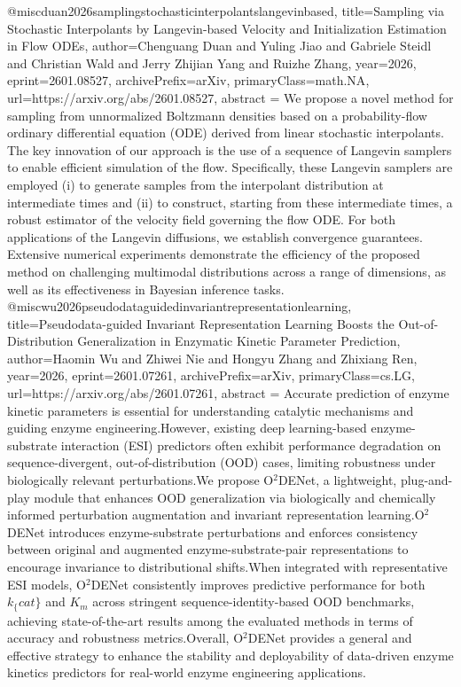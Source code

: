 {}@misc{duan2026samplingstochasticinterpolantslangevinbased,
      title={Sampling via Stochastic Interpolants by Langevin-based Velocity and Initialization Estimation in Flow ODEs}, 
      author={Chenguang Duan and Yuling Jiao and Gabriele Steidl and Christian Wald and Jerry Zhijian Yang and Ruizhe Zhang},
      year={2026},
      eprint={2601.08527},
      archivePrefix={arXiv},
      primaryClass={math.NA},
      url={https://arxiv.org/abs/2601.08527},
      abstract = {We propose a novel method for sampling from unnormalized Boltzmann densities based on a probability-flow ordinary differential equation (ODE) derived from linear stochastic interpolants. The key innovation of our approach is the use of a sequence of Langevin samplers to enable efficient simulation of the flow. Specifically, these Langevin samplers are employed (i) to generate samples from the interpolant distribution at intermediate times and (ii) to construct, starting from these intermediate times, a robust estimator of the velocity field governing the flow ODE. For both applications of the Langevin diffusions, we establish convergence guarantees. Extensive numerical experiments demonstrate the efficiency of the proposed method on challenging multimodal distributions across a range of dimensions, as well as its effectiveness in Bayesian inference tasks.}
}@misc{wu2026pseudodataguidedinvariantrepresentationlearning,
      title={Pseudodata-guided Invariant Representation Learning Boosts the Out-of-Distribution Generalization in Enzymatic Kinetic Parameter Prediction}, 
      author={Haomin Wu and Zhiwei Nie and Hongyu Zhang and Zhixiang Ren},
      year={2026},
      eprint={2601.07261},
      archivePrefix={arXiv},
      primaryClass={cs.LG},
      url={https://arxiv.org/abs/2601.07261},
      abstract = {Accurate prediction of enzyme kinetic parameters is essential for understanding catalytic mechanisms and guiding enzyme engineering.However, existing deep learning-based enzyme-substrate interaction (ESI) predictors often exhibit performance degradation on sequence-divergent, out-of-distribution (OOD) cases, limiting robustness under biologically relevant perturbations.We propose O$^2$DENet, a lightweight, plug-and-play module that enhances OOD generalization via biologically and chemically informed perturbation augmentation and invariant representation learning.O$^2$DENet introduces enzyme-substrate perturbations and enforces consistency between original and augmented enzyme-substrate-pair representations to encourage invariance to distributional shifts.When integrated with representative ESI models, O$^2$DENet consistently improves predictive performance for both $k_\{cat\}$ and $K_m$ across stringent sequence-identity-based OOD benchmarks, achieving state-of-the-art results among the evaluated methods in terms of accuracy and robustness metrics.Overall, O$^2$DENet provides a general and effective strategy to enhance the stability and deployability of data-driven enzyme kinetics predictors for real-world enzyme engineering applications.}
}
